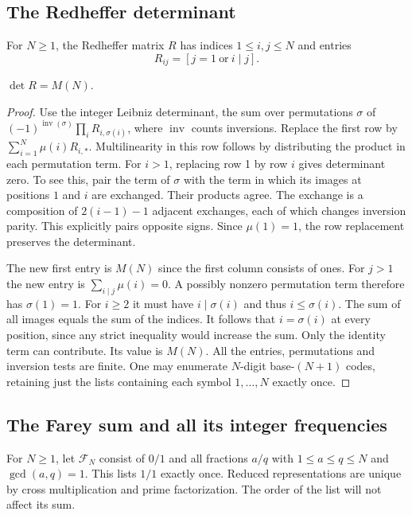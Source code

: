 \subsection{The Redheffer determinant}
For $N\ge1$, the Redheffer matrix $R$ has indices $1\le i,j\le N$ and entries
\[
 R_{ij}=[j=1\ \text{or}\ i\mid j].
\]
\begin{theorem}\label{thm:redheffer}
$\det R=M(N)$.
\end{theorem}
\begin{proof}
Use the integer Leibniz determinant, the sum over permutations $\sigma$
of $(-1)^{\operatorname{inv}(\sigma)}\prod_i R_{i,\sigma(i)}$, where
$\operatorname{inv}$ counts inversions. Replace the first row by
$\sum_{i=1}^N\mu(i)R_{i,*}$. Multilinearity in this row follows by
distributing the product in each permutation term. For $i>1$, replacing
row 1 by row $i$ gives determinant zero. To see this, pair the term of
$\sigma$ with the term in which its images at positions $1$ and $i$
are exchanged. Their products agree. The exchange is a composition of
$2(i-1)-1$ adjacent exchanges, each of which changes inversion parity.
This explicitly pairs opposite signs. Since $\mu(1)=1$, the row
replacement preserves the determinant.

The new first entry is $M(N)$ since the first column consists of ones.
For $j>1$ the new entry is $\sum_{i\mid j}\mu(i)=0$. A possibly
nonzero permutation term therefore has $\sigma(1)=1$. For $i\ge2$ it
must have $i\mid\sigma(i)$ and thus $i\le\sigma(i)$. The sum of all
images equals the sum of the indices. It follows that $i=\sigma(i)$ at
every position, since any strict inequality would increase the sum. Only
the identity term can contribute. Its value is $M(N)$. All the entries,
permutations and inversion tests are finite. One may enumerate $N$-digit
base-$(N+1)$ codes, retaining just the lists containing each symbol
$1,\ldots,N$ exactly once.
\end{proof}

\subsection{The Farey sum and all its integer frequencies}
For $N\ge1$, let $\mathcal F_N$ consist of $0/1$ and all fractions
$a/q$ with $1\le a\le q\le N$ and $\gcd(a,q)=1$. This lists $1/1$
exactly once. Reduced representations are unique by cross multiplication
and prime factorization. The order of the list will not affect its sum.

